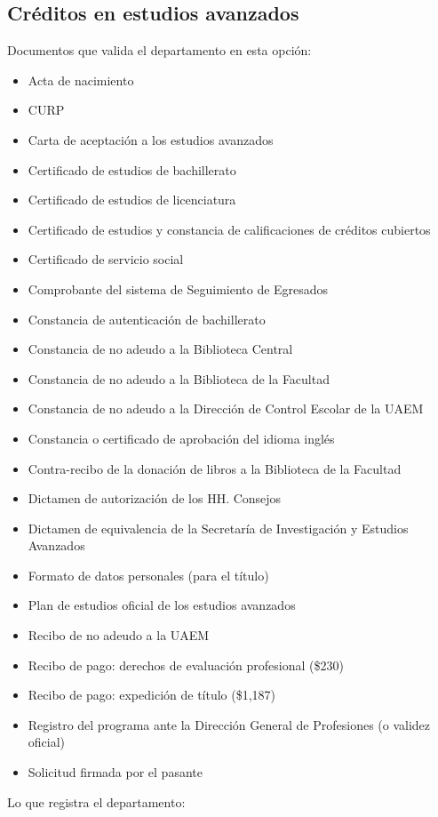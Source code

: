 \subsection{Créditos en estudios avanzados}
Documentos que valida el departamento en esta opción:
\begin{itemize}
  \item Acta de nacimiento
  \item CURP
  \item Carta de aceptación a los estudios avanzados
  \item Certificado de estudios de bachillerato
  \item Certificado de estudios de licenciatura
  \item Certificado de estudios y constancia de calificaciones de créditos cubiertos
  \item Certificado de servicio social
  \item Comprobante del sistema de Seguimiento de Egresados
  \item Constancia de autenticación de bachillerato
  \item Constancia de no adeudo a la Biblioteca Central
  \item Constancia de no adeudo a la Biblioteca de la Facultad
  \item Constancia de no adeudo a la Dirección de Control Escolar de la UAEM
  \item Constancia o certificado de aprobación del idioma inglés
  \item Contra-recibo de la donación de libros a la Biblioteca de la Facultad
  \item Dictamen de autorización de los HH. Consejos
  \item Dictamen de equivalencia de la Secretaría de Investigación y Estudios Avanzados
  \item Formato de datos personales (para el título)
  \item Plan de estudios oficial de los estudios avanzados
  \item Recibo de no adeudo a la UAEM
  \item Recibo de pago: derechos de evaluación profesional (\$230)
  \item Recibo de pago: expedición de título (\$1,187)
  \item Registro del programa ante la Dirección General de Profesiones (o validez oficial)
  \item Solicitud firmada por el pasante
\end{itemize}
Lo que registra el departamento:
